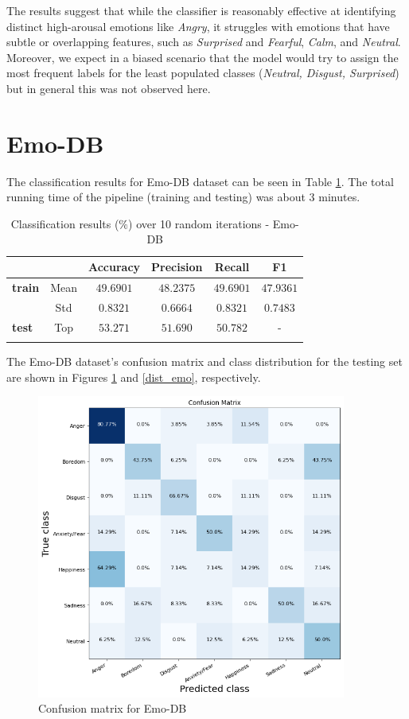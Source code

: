 The results suggest that while the classifier is reasonably effective at identifying distinct high-arousal emotions like \textit{Angry}, it struggles with emotions that have subtle or overlapping features, such as \textit{Surprised} and \textit{Fearful}, \textit{Calm}, and \textit{Neutral}. Moreover, we expect in a biased scenario that the model would try to assign the most frequent labels for the least populated classes (\textit{Neutral, Disgust, Surprised}) but in general this was not observed here.

\section{Emo-DB}

The classification results for Emo-DB dataset can be seen in Table \ref{emo_results}. The total running time of the pipeline (training and testing) was about 3 minutes.

\begin{table}[h!]
\centering
\caption{Classification results ($\%$) over 10 random iterations - Emo-DB}
\begin{tabular}{lccccc}
\hline
 &  & Accuracy & Precision & Recall & F1 \\
\hline
\textbf{train} & Mean  & $49.6901$ & $48.2375$ & $49.6901$ & $47.9361$  \\
& Std   & $0.8321$ & $0.6664$ & $0.8321$ & $0.7483$  \\
\hline
\textbf{test}  & Top  & $53.271$   & $51.690$   & $50.782$   & -           \\
\hline
\label{emo_results}
\end{tabular}
\end{table}

The Emo-DB dataset's confusion matrix and class distribution for the testing set are shown in Figures \ref{conf_matrix_emo} and \ref{dist_emo}, respectively.

\begin{figure}[H]
  \centering
  \includegraphics[width = 4in, keepaspectratio]{figures/CM_EMODB.png}
  \caption{Confusion matrix for Emo-DB}
  \label{conf_matrix_emo}
\end{figure}

